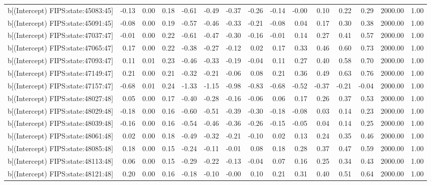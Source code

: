 \begin{table}[ht]
\begin{tabular}{rrrrrrrrrrrrrrr}
  b[(Intercept) FIPS:state:45083:45] & -0.13 & 0.00 & 0.18 & -0.61 & -0.49 & -0.37 & -0.26 & -0.14 & -0.00 & 0.10 & 0.22 & 0.29 & 2000.00 & 1.00 \\ 
  b[(Intercept) FIPS:state:45091:45] & -0.08 & 0.00 & 0.19 & -0.57 & -0.46 & -0.33 & -0.21 & -0.08 & 0.04 & 0.17 & 0.30 & 0.38 & 2000.00 & 1.00 \\ 
  b[(Intercept) FIPS:state:47037:47] & -0.01 & 0.00 & 0.22 & -0.61 & -0.47 & -0.30 & -0.16 & -0.01 & 0.14 & 0.27 & 0.41 & 0.57 & 2000.00 & 1.00 \\ 
  b[(Intercept) FIPS:state:47065:47] & 0.17 & 0.00 & 0.22 & -0.38 & -0.27 & -0.12 & 0.02 & 0.17 & 0.33 & 0.46 & 0.60 & 0.73 & 2000.00 & 1.00 \\ 
  b[(Intercept) FIPS:state:47093:47] & 0.11 & 0.01 & 0.23 & -0.46 & -0.33 & -0.19 & -0.04 & 0.11 & 0.27 & 0.40 & 0.58 & 0.70 & 2000.00 & 1.00 \\ 
  b[(Intercept) FIPS:state:47149:47] & 0.21 & 0.00 & 0.21 & -0.32 & -0.21 & -0.06 & 0.08 & 0.21 & 0.36 & 0.49 & 0.63 & 0.76 & 2000.00 & 1.00 \\ 
  b[(Intercept) FIPS:state:47157:47] & -0.68 & 0.01 & 0.24 & -1.33 & -1.15 & -0.98 & -0.83 & -0.68 & -0.52 & -0.37 & -0.21 & -0.04 & 2000.00 & 1.00 \\ 
  b[(Intercept) FIPS:state:48027:48] & 0.05 & 0.00 & 0.17 & -0.40 & -0.28 & -0.16 & -0.06 & 0.06 & 0.17 & 0.26 & 0.37 & 0.53 & 2000.00 & 1.00 \\ 
  b[(Intercept) FIPS:state:48029:48] & -0.18 & 0.00 & 0.16 & -0.60 & -0.51 & -0.39 & -0.30 & -0.18 & -0.08 & 0.03 & 0.14 & 0.23 & 2000.00 & 1.00 \\ 
  b[(Intercept) FIPS:state:48039:48] & -0.16 & 0.00 & 0.16 & -0.54 & -0.46 & -0.36 & -0.26 & -0.15 & -0.05 & 0.04 & 0.14 & 0.25 & 2000.00 & 1.00 \\ 
  b[(Intercept) FIPS:state:48061:48] & 0.02 & 0.00 & 0.18 & -0.49 & -0.32 & -0.21 & -0.10 & 0.02 & 0.13 & 0.24 & 0.35 & 0.46 & 2000.00 & 1.00 \\ 
  b[(Intercept) FIPS:state:48085:48] & 0.18 & 0.00 & 0.15 & -0.24 & -0.11 & -0.01 & 0.08 & 0.18 & 0.28 & 0.37 & 0.47 & 0.59 & 2000.00 & 1.00 \\ 
  b[(Intercept) FIPS:state:48113:48] & 0.06 & 0.00 & 0.15 & -0.29 & -0.22 & -0.13 & -0.04 & 0.07 & 0.16 & 0.25 & 0.34 & 0.43 & 2000.00 & 1.00 \\ 
  b[(Intercept) FIPS:state:48121:48] & 0.20 & 0.00 & 0.16 & -0.18 & -0.10 & -0.00 & 0.10 & 0.21 & 0.31 & 0.40 & 0.51 & 0.64 & 2000.00 & 1.00 \\ 

\end{tabular}
\end{table}
